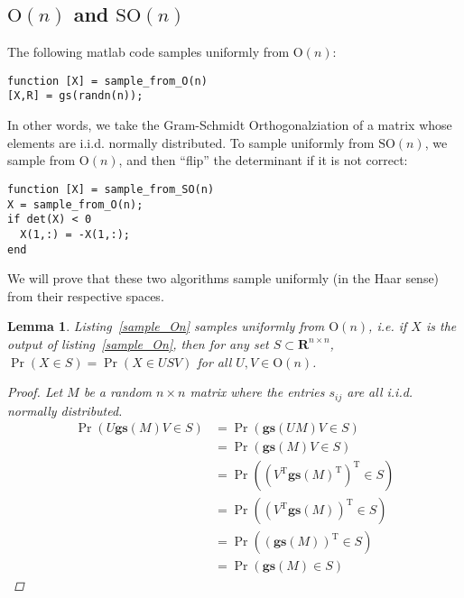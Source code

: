 \documentclass[letterpaper,11pt]{article}
\newtheorem{lemma}{Lemma}
\newcommand{\Tr}{^\text{T}}
\newcommand{\reals}{\mathbf{R}}
\newcommand{\MG}[2]{{\text{#1}(#2)}}
\newcommand{\On}{\MG{O}{n}}
\newcommand{\SOn}{\MG{SO}{n}}
\newcommand{\GS}{\mathbf{gs}}
\begin{document}
\subsection{$\On$ and $\SOn$}
The following matlab code samples uniformly from $\On$:

\begin{lstlisting}[label=sample_On,caption=Sampling from $\On$]
function [X] = sample_from_O(n)
[X,R] = gs(randn(n));
\end{lstlisting}

In other words, we take the Gram-Schmidt Orthogonalziation of a matrix whose elements are i.i.d.
  normally distributed.
To sample uniformly from $\SOn$, we sample from $\On$, and then
  ``flip'' the determinant if it is not correct:

\begin{lstlisting}[label=sample_SOn,caption=Sampling from $\SOn$]
function [X] = sample_from_SO(n)
X = sample_from_O(n);
if det(X) < 0
  X(1,:) = -X(1,:);
end
\end{lstlisting}

We will prove that these two algorithms sample uniformly (in the Haar sense)
  from their respective spaces.

\begin{lemma}
Listing~\ref{sample_On} samples uniformly from $\On$, i.e. if $X$
  is the output of listing~\ref{sample_On}, then for any set $S\subset
  \reals^{n\times n}$, $\Pr(X\in S) = \Pr(X\in USV)$ for all $U,V \in \On$.

\begin{proof}
Let $M$ be a random $n\times n$ matrix where the entries $s_{ij}$ are all i.i.d.
  normally distributed.
\begin{align}
\Pr\left(U\GS(M)V\in S\right) &= \Pr\left(\GS(UM)V \in S\right)\\
  &= \Pr\left(\GS(M)V \in S             \right)\\
  &= \Pr\left( (V\Tr\GS(M)\Tr)\Tr \in S \right)\\
  &= \Pr\left( (V\Tr\GS(M))\Tr \in S    \right)\\
  &= \Pr\left((\GS(M))\Tr \in S         \right)\\
  &= \Pr\left(\GS(M) \in S              \right)
\end{align}
\end{proof}
\end{lemma}
\end{document}
